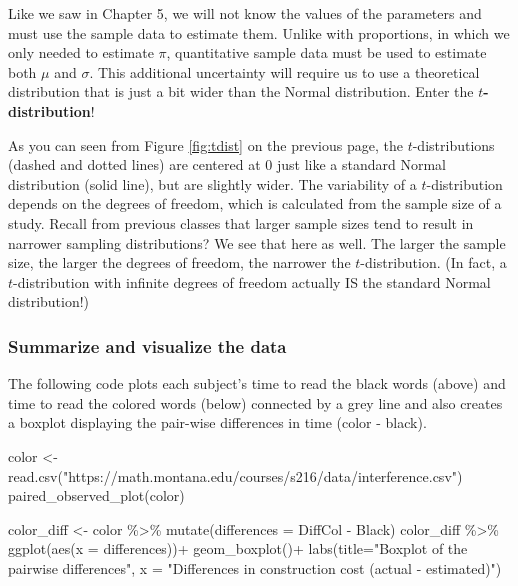\documentclass[
]{report}
\newenvironment{Shaded}{\begin{snugshade}}{\end{snugshade}}
\newcommand{\AttributeTok}[1]{\textcolor[rgb]{0.77,0.63,0.00}{#1}}
\newcommand{\FunctionTok}[1]{\textcolor[rgb]{0.00,0.00,0.00}{#1}}
\newcommand{\NormalTok}[1]{#1}
\newcommand{\OtherTok}[1]{\textcolor[rgb]{0.56,0.35,0.01}{#1}}
\newcommand{\SpecialCharTok}[1]{\textcolor[rgb]{0.00,0.00,0.00}{#1}}
\newcommand{\StringTok}[1]{\textcolor[rgb]{0.31,0.60,0.02}{#1}}
\begin{document}
Like we saw in Chapter 5, we will not know the values of the parameters and must use the sample data to estimate them. Unlike with proportions, in which we only needed to estimate \(\pi\), quantitative sample data must be used to estimate both \(\mu\) and \(\sigma\). This additional uncertainty will require us to use a theoretical distribution that is just a bit wider than the Normal distribution. Enter the \textbf{\(t\)-distribution}!

As you can seen from Figure \ref{fig:tdist} on the previous page, the \(t\)-distributions (dashed and dotted lines) are centered at 0 just like a standard Normal distribution (solid line), but are slightly wider. The variability of a \(t\)-distribution depends on the degrees of freedom, which is calculated from the sample size of a study. Recall from previous classes that larger sample sizes tend to result in narrower sampling distributions? We see that here as well. The larger the sample size, the larger the degrees of freedom, the narrower the \(t\)-distribution. (In fact, a \(t\)-distribution with infinite degrees of freedom actually IS the standard Normal distribution!)

\hypertarget{summarize-and-visualize-the-data-3}{%
\subsubsection*{Summarize and visualize the data}\label{summarize-and-visualize-the-data-3}}

The following code plots each subject's time to read the black words (above) and time to read the colored words (below) connected by a grey line and also creates a boxplot displaying the pair-wise differences in time (color - black).

\begin{Shaded}
\begin{Highlighting}[]
\NormalTok{color }\OtherTok{\textless{}{-}} \FunctionTok{read.csv}\NormalTok{(}\StringTok{"https://math.montana.edu/courses/s216/data/interference.csv"}\NormalTok{)}
\FunctionTok{paired\_observed\_plot}\NormalTok{(color)}

\NormalTok{color\_diff }\OtherTok{\textless{}{-}}\NormalTok{ color }\SpecialCharTok{\%\textgreater{}\%} 
  \FunctionTok{mutate}\NormalTok{(}\AttributeTok{differences =}\NormalTok{ DiffCol }\SpecialCharTok{{-}}\NormalTok{ Black)}
\NormalTok{color\_diff }\SpecialCharTok{\%\textgreater{}\%}
  \FunctionTok{ggplot}\NormalTok{(}\FunctionTok{aes}\NormalTok{(}\AttributeTok{x =}\NormalTok{ differences))}\SpecialCharTok{+}
  \FunctionTok{geom\_boxplot}\NormalTok{()}\SpecialCharTok{+}
  \FunctionTok{labs}\NormalTok{(}\AttributeTok{title=}\StringTok{"Boxplot of the pairwise differences"}\NormalTok{,}
       \AttributeTok{x =} \StringTok{"Differences in construction cost (actual {-} estimated)"}\NormalTok{)}
\end{Highlighting}
\end{Shaded}
\end{document}
